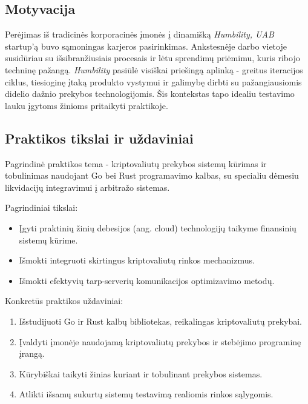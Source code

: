 \documentclass[]{VUMIFTemplateClass}
\begin{document}

\onehalfspacing



\singlespacing

\tableofcontents
\onehalfspacing


\subsection*{Motyvacija}
Perėjimas iš tradicinės korporacinės įmonės į dinamišką \textit{Humbility, UAB} startup'ą buvo sąmoningas karjeros pasirinkimas. Ankstesnėje darbo vietoje susidūriau su išsibranžiusiais procesais ir lėtu sprendimų priėmimu, kuris ribojo techninę pažangą. \textit{Humbility} pasiūlė visiškai priešingą aplinką - greitus iteracijos ciklus, tiesioginę įtaką produkto vystymui ir galimybę dirbti su pažangiausiomis didelio dažnio prekybos technologijomis. Šis kontekstas tapo idealiu testavimo lauku įgytoms žinioms pritaikyti praktikoje.

\subsection*{Praktikos tikslai ir uždaviniai}
Pagrindinė praktikos tema - kriptovaliutų prekybos sistemų kūrimas ir tobulinimas naudojant Go bei Rust programavimo kalbas, su specialiu dėmesiu likvidacijų integravimui į arbitražo sistemas.

Pagrindiniai tikslai:
\begin{itemize}
\item Įgyti praktinių žinių debesijos (ang. cloud) technologijų taikyme finansinių sistemų kūrime.
\item Išmokti integruoti skirtingus kriptovaliutų rinkos mechanizmus.
\item Išmokti efektyvių tarp-serverių komunikacijos optimizavimo metodų.
\end{itemize}

Konkretūs praktikos uždaviniai:
\begin{enumerate}
\item Išstudijuoti Go ir Rust kalbų bibliotekas, reikalingas kriptovaliutų prekybai.
\item Įvaldyti įmonėje naudojamą kriptovaliutų prekybos ir stebėjimo programinę įrangą.
\item Kūrybiškai taikyti žinias kuriant ir tobulinant prekybos sistemas.
\item Atlikti išsamų sukurtų sistemų testavimą realiomis rinkos sąlygomis.
\end{enumerate}
\end{document}

